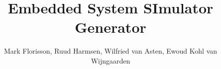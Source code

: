 \documentclass{beamer}
\title[]{\LARGE \textbf{Embedded System SImulator Generator}}
\author[]{\large
	Mark Florisson,
	Ruud Harmsen,
	Wilfried van Asten,
	Ewoud Kohl van Wijngaarden
  }
\institute{\Large \vfill {Ontwerpproject (192199109) -- Faculty of Electrical Engineering -- University of Twente} }
\date{}
\begin{document}
  \begin{frame}{}

\vspace{-1cm}
\begin{columns}[t]
\begin{column}{.02\linewidth}\end{column}
\begin{column}{.97\linewidth}\end{column}
\begin{column}{.02\linewidth}\end{column}
\end{columns}

\linewidth

\begin{columns}[t]
\begin{column}{.02\linewidth}\end{column}
\begin{column}{.313\linewidth}\end{column}
\begin{column}{.01\linewidth}\end{column}
\begin{column}{.313\linewidth}\end{column}
\begin{column}{.01\linewidth}\end{column}
\begin{column}{.313\linewidth}\end{column}
\begin{column}{.02\linewidth}\end{column}
\end{columns}

{}\linewidth

\begin{columns}[t]
\begin{column}{.02\linewidth}\end{column}
\begin{column}{.97\linewidth}\end{column}
\begin{column}{.02\linewidth}\end{column}
\end{columns}


\end{frame}
\end{document}
